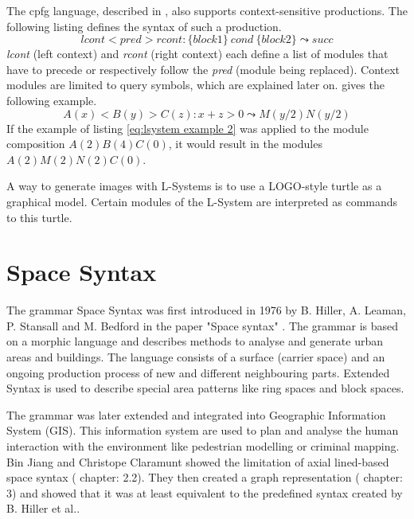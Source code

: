 \documentclass[11pt, a4paper]{report}
\begin{document}
The cpfg language, described in \citep{PrusinkiewiczEtAl:2001}, also supports context-sensitive productions. The following listing defines the syntax of such a production.
\begin{equation} \label{eq:lsystem context sensitive}
    lcont < pred > rcont : \{block1\}\ cond\ \{block2\} \leadsto succ
\end{equation}
\textit{lcont} (left context) and \textit{rcont} (right context) each define a list of modules that have to precede or respectively follow the \textit{pred} (module being replaced). Context modules are limited to query symbols, which are explained later on. \citep{PrusinkiewiczEtAl:2001} gives the following example.
\begin{equation} \label{eq:lsystem example 2}
    A(x) < B(y) > C(z) : x + z > 0 \leadsto M(y / 2)N(y / 2)
\end{equation}
If the example of listing \ref{eq:lsystem example 2} was applied to the module composition $A(2)B(4)C(0)$, it would result in the modules $A(2)M(2)N(2)C(0)$.

A way to generate images with L-Systems is to use a LOGO-style turtle as a graphical model. Certain modules of the L-System are interpreted as commands to this turtle.

\pagebreak
\section{Space Syntax}
The grammar Space Syntax was first introduced in 1976 by B. Hiller, A. Leaman, P. Stansall and M. Bedford in the paper "Space syntax" \citep{spaceSyntax:1976}. The grammar is based on a morphic language and describes methods to analyse and generate urban areas and buildings.
The language consists of a surface (carrier space) and an ongoing production process of new and different neighbouring parts. Extended Syntax is used to describe special area patterns like ring spaces and block spaces.

The grammar was later extended and integrated into Geographic Information System (GIS). This information system are used to plan and analyse the human interaction with the environment like pedestrian modelling or criminal mapping.
Bin Jiang and Christope Claramunt \citep{integrationSpaceSyntaxGIS:2002} showed the limitation of axial lined-based space syntax (\citep{integrationSpaceSyntaxGIS:2002} chapter: 2.2). They then created a graph representation (\citep{integrationSpaceSyntaxGIS:2002} chapter: 3) and showed that it was at least equivalent to the predefined syntax created by B. Hiller et al.\citep{spaceSyntax:1976}.
\end{document}
